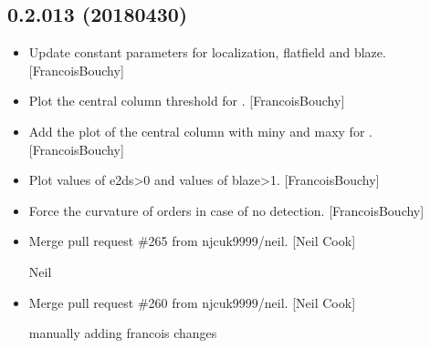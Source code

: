 \documentclass[a4paper,10pt,english]{report}
\begin{document}
\subsection{0.2.013 (2018\sphinxhyphen{}04\sphinxhyphen{}30)}
\label{\detokenize{misc/changelog:id467}}\begin{itemize}
\item {} 
Update constant parameters for localization, flat\sphinxhyphen{}field and blaze.
{[}FrancoisBouchy{]}

\item {} 
Plot the central column threshold for . {[}FrancoisBouchy{]}

\item {} 
Add the plot of the central column with miny and maxy for .
{[}FrancoisBouchy{]}

\item {} 
Plot values of e2ds\textgreater{}0 and values of blaze\textgreater{}1. {[}FrancoisBouchy{]}

\item {} 
Force the curvature of orders in case of no detection.
{[}FrancoisBouchy{]}

\item {} 
Merge pull request \#265 from njcuk9999/neil. {[}Neil Cook{]}

Neil

\item {} 
Merge pull request \#260 from njcuk9999/neil. {[}Neil Cook{]}

manually adding francois changes

\end{itemize}
\end{document}
